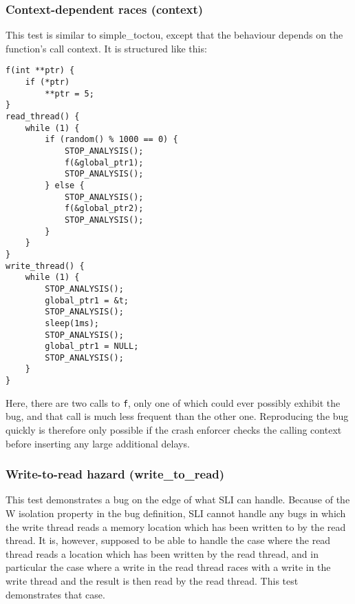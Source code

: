 \subsubsection{Context-dependent races (context)}

This test is similar to simple\_toctou, except that the behaviour
depends on the function's call context.  It is structured like this:

\begin{verbatim}
f(int **ptr) {
    if (*ptr)
        **ptr = 5;   
}
read_thread() {
    while (1) {
        if (random() % 1000 == 0) {
            STOP_ANALYSIS();
            f(&global_ptr1);
            STOP_ANALYSIS();
        } else {
            STOP_ANALYSIS();
            f(&global_ptr2);
            STOP_ANALYSIS();
        }
    }
}        
write_thread() {
    while (1) {
        STOP_ANALYSIS();
        global_ptr1 = &t;
        STOP_ANALYSIS();
        sleep(1ms);
        STOP_ANALYSIS();
        global_ptr1 = NULL;
        STOP_ANALYSIS();
    }
}
\end{verbatim}

Here, there are two calls to \verb|f|, only one of which could ever
possibly exhibit the bug, and that call is much less frequent than the
other one.  Reproducing the bug quickly is therefore only possible if
the crash enforcer checks the calling context before inserting any
large additional delays.


\subsubsection{Write-to-read hazard (write\_to\_read)}

This test demonstrates a bug on the edge of what SLI can handle.
Because of the W isolation property in the bug definition, SLI cannot
handle any bugs in which the write thread reads a memory location
which has been written to by the read thread.  It is, however,
supposed to be able to handle the case where the read thread reads a
location which has been written by the read thread, and in particular
the case where a write in the read thread races with a write in the
write thread and the result is then read by the read thread.  This
test demonstrates that case.

